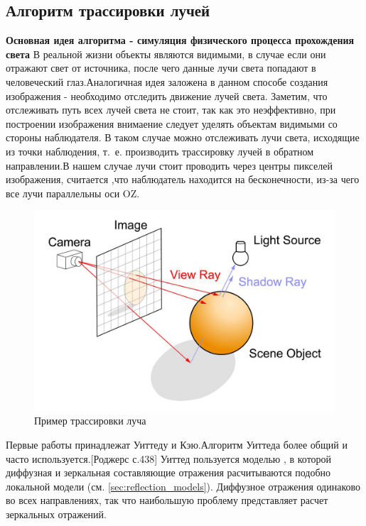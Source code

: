 \documentclass[a4paper,14pt, unknownkeysallowed]{extreport}
\begin{document}
\subsection{Алгоритм трассировки лучей}
\label{sec:ray_tracing}
\textbf{Основная идея алгоритма - симуляция физического процесса прохождения света} \newline
В реальной жизни объекты являются видимыми, в случае если они отражают свет от источника, после чего данные лучи света попадают в человеческий глаз.Аналогичная идея заложена в данном способе создания изображения - необходимо отследить движение лучей света.
Заметим, что отслеживать путь всех лучей света не стоит, так как это неэффективно, при построении изображения внимаение следует уделять объектам видимыми со стороны наблюдателя.
В таком случае можно отслеживать лучи света, исходящие из точки наблюдения, т.~е. производить трассировку лучей в обратном направлении.В нашем случае лучи стоит проводить через центры пикселей изображения,
считается ,что наблюдатель находится на бесконечности, из-за чего все лучи параллельны оси OZ.\cite{Rodgers,modern_ray_tracing}

\begin{figure}[h]
	\centering
	\includegraphics[scale=0.4]{ray_tracing.jpg}
	\caption{Пример трассировки луча}
	\label{fig:alg_ray_tracing}
\end{figure} 

Первые работы принадлежат Уиттеду и Кэю.Алгоритм Уиттеда более общий и часто используется.[Роджерс с.438]
Уиттед пользуется моделью , в которой диффузная и зеркальная составляющие отражения расчитываются подобно локальной модели (см. \ref{sec:reflection_models}).
Диффузное отражения одинаково во всех направлениях, так что наибольшую проблему представляет расчет зеркальных отражений.\cite{Rodgers}
\end{document}
